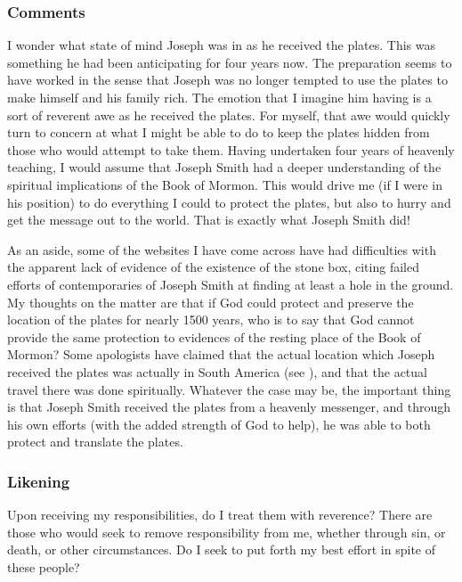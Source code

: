\documentclass[12pt]{report}
\begin{document}
\subsubsection{Comments\label{js:comments22}}
I wonder what state of mind Joseph was in as he received the plates.  This was something he had been anticipating for four years now.  The preparation seems to have worked in the sense that Joseph was no longer tempted to use the plates to make himself and his family rich.  The emotion that I imagine him having is a sort of reverent awe as he received the plates.  For myself, that awe would quickly turn to concern at what I might be able to do to keep the plates hidden from those who would attempt to take them.  Having undertaken four years of heavenly teaching, I would assume that Joseph Smith had a deeper understanding of the spiritual implications of the Book of Mormon.  This would drive me (if I were in his position) to do everything I could to protect the plates, but also to hurry and get the message out to the world.  That is exactly what Joseph Smith did!

As an aside, some of the websites I have come across have had difficulties with the apparent lack of evidence of the existence of the stone box, citing failed efforts of contemporaries of Joseph Smith at finding at least a hole in the ground.  My thoughts on the matter are that if God could protect and preserve the location of the plates for nearly 1500 years, who is to say that God cannot provide the same protection to evidences of the resting place of the Book of Mormon?  Some apologists have claimed that the actual location which Joseph received the plates was actually in South America (see ), and that the actual travel there was done spiritually.  Whatever the case may be, the important thing is that Joseph Smith received the plates from a heavenly messenger, and through his own efforts (with the added strength of God to help), he was able to both protect and translate the plates.

\subsubsection{Likening\label{js:likening22}}
Upon receiving my responsibilities, do I treat them with reverence?  There are those who would seek to remove responsibility from me, whether through sin, or death, or other circumstances.  Do I seek to put forth my best effort in spite of these people?
\end{document}

